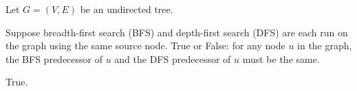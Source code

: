 \begin{prob}

    Let $G = (V, E)$ be an undirected tree.

    Suppose breadth-first search (BFS) and depth-first search (DFS) are each
    run on the graph using the same source node. True or False: for any node
    $u$ in the graph, the BFS predecessor of $u$ and the DFS predecessor of $u$
    must be the same.

    \Tf{}

    \begin{soln}
        True.
    \end{soln}

\end{prob}
